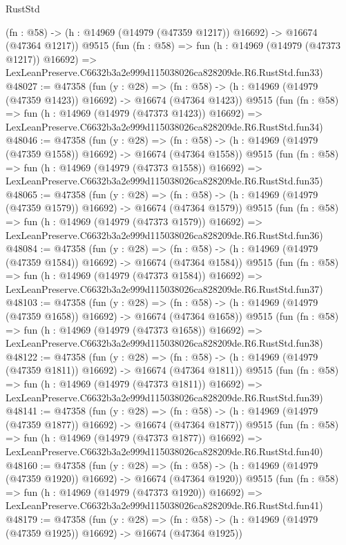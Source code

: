 \begin{lexlean}{RustStd}
\begin{coremodule}
    (fn : @58) -> (h : @14969 (@14979 (@47359 @1217)) @16692) -> @16674 (@47364 @1217))
    @9515
    (fun (fn : @58) =>
    fun (h : @14969 (@14979 (@47373 @1217)) @16692) =>
    LexLeanPreserve.C6632b3a2e999d115038026ca828209de.R6.RustStd.fun33)
@48027 := @47358
    (fun (y : @28) =>
    (fn : @58) -> (h : @14969 (@14979 (@47359 @1423)) @16692) -> @16674 (@47364 @1423))
    @9515
    (fun (fn : @58) =>
    fun (h : @14969 (@14979 (@47373 @1423)) @16692) =>
    LexLeanPreserve.C6632b3a2e999d115038026ca828209de.R6.RustStd.fun34)
@48046 := @47358
    (fun (y : @28) =>
    (fn : @58) -> (h : @14969 (@14979 (@47359 @1558)) @16692) -> @16674 (@47364 @1558))
    @9515
    (fun (fn : @58) =>
    fun (h : @14969 (@14979 (@47373 @1558)) @16692) =>
    LexLeanPreserve.C6632b3a2e999d115038026ca828209de.R6.RustStd.fun35)
@48065 := @47358
    (fun (y : @28) =>
    (fn : @58) -> (h : @14969 (@14979 (@47359 @1579)) @16692) -> @16674 (@47364 @1579))
    @9515
    (fun (fn : @58) =>
    fun (h : @14969 (@14979 (@47373 @1579)) @16692) =>
    LexLeanPreserve.C6632b3a2e999d115038026ca828209de.R6.RustStd.fun36)
@48084 := @47358
    (fun (y : @28) =>
    (fn : @58) -> (h : @14969 (@14979 (@47359 @1584)) @16692) -> @16674 (@47364 @1584))
    @9515
    (fun (fn : @58) =>
    fun (h : @14969 (@14979 (@47373 @1584)) @16692) =>
    LexLeanPreserve.C6632b3a2e999d115038026ca828209de.R6.RustStd.fun37)
@48103 := @47358
    (fun (y : @28) =>
    (fn : @58) -> (h : @14969 (@14979 (@47359 @1658)) @16692) -> @16674 (@47364 @1658))
    @9515
    (fun (fn : @58) =>
    fun (h : @14969 (@14979 (@47373 @1658)) @16692) =>
    LexLeanPreserve.C6632b3a2e999d115038026ca828209de.R6.RustStd.fun38)
@48122 := @47358
    (fun (y : @28) =>
    (fn : @58) -> (h : @14969 (@14979 (@47359 @1811)) @16692) -> @16674 (@47364 @1811))
    @9515
    (fun (fn : @58) =>
    fun (h : @14969 (@14979 (@47373 @1811)) @16692) =>
    LexLeanPreserve.C6632b3a2e999d115038026ca828209de.R6.RustStd.fun39)
@48141 := @47358
    (fun (y : @28) =>
    (fn : @58) -> (h : @14969 (@14979 (@47359 @1877)) @16692) -> @16674 (@47364 @1877))
    @9515
    (fun (fn : @58) =>
    fun (h : @14969 (@14979 (@47373 @1877)) @16692) =>
    LexLeanPreserve.C6632b3a2e999d115038026ca828209de.R6.RustStd.fun40)
@48160 := @47358
    (fun (y : @28) =>
    (fn : @58) -> (h : @14969 (@14979 (@47359 @1920)) @16692) -> @16674 (@47364 @1920))
    @9515
    (fun (fn : @58) =>
    fun (h : @14969 (@14979 (@47373 @1920)) @16692) =>
    LexLeanPreserve.C6632b3a2e999d115038026ca828209de.R6.RustStd.fun41)
@48179 := @47358
    (fun (y : @28) =>
    (fn : @58) -> (h : @14969 (@14979 (@47359 @1925)) @16692) -> @16674 (@47364 @1925))

\end{coremodule}
\end{lexlean}
